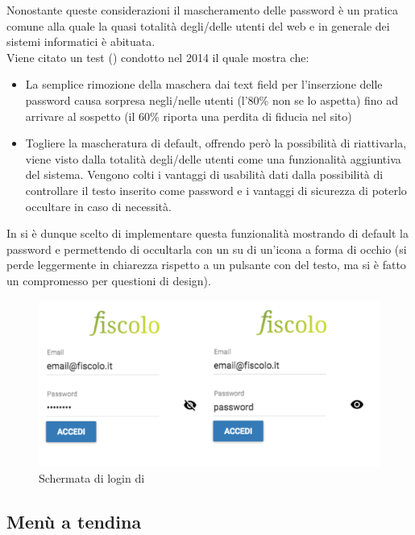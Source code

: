 Nonostante queste considerazioni il mascheramento delle password è un pratica comune
alla quale la quasi totalità degli/delle utenti del web e in generale dei sistemi informatici
è abituata.\\

Viene citato un test (\cite{pass-test}) condotto nel 2014 il quale mostra che:

\begin{itemize}
\item La semplice rimozione della maschera dai text field per l'inserzione delle password
causa sorpresa negli/nelle utenti (l'80\% non se lo aspetta) fino ad arrivare al sospetto
(il 60\% riporta una perdita di fiducia nel sito)
\item Togliere la mascheratura di default, offrendo però la possibilità di riattivarla,
viene visto dalla totalità degli/delle utenti come una funzionalità aggiuntiva del sistema.
Vengono colti i vantaggi di usabilità dati dalla possibilità di controllare il testo
inserito come password e i vantaggi di sicurezza di poterlo occultare in caso di necessità.
\end{itemize}

In \fiscoloMobile{} si è dunque scelto di implementare questa funzionalità mostrando di
default la password e permettendo di occultarla con un  su di un'icona a forma di
occhio
(si perde leggermente in chiarezza rispetto a un pulsante con del testo, ma si è fatto un
compromesso per questioni di design).

\begin{figure}[H]\label{imgLoginPassword}
	\centering
	\includegraphics[width=.8\columnwidth]{images/loginPage.png}
	\caption{Schermata di login di \fiscoloMobile}
\end{figure}

\subsection[Menù a tendina]{Menù a tendina}

